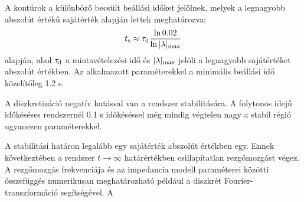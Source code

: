 A kontúrok a különböző becsült beállási időket jelölnek, melyek a legnagyobb abszolút értékű sajátérték 
alapján lettek meghatározva:
\begin{align}
    \begin{split}
        t_{\mathrm{s}} \approx \tau_{\mathrm{d}} \frac{\ln{0.02}}{\ln{|\lambda|_{\mathrm{max}}}}
    \end{split}        
\end{align}
alapján, ahol \(\tau_{\mathrm{d}}\) a mintavételezési idő és \(|\lambda|_{\mathrm{max}}\) jelöli a legnagyobb sajátértéket 
abszolút értékben. Az alkalmazott paraméterekkel a minimális beállási idő közelítőleg 1.2 s. 

A diszkretizáció negatív hatással van a rendszer stabilitására. A folytonos idejű időkéséses rendszernél 0.1 s 
időkéséssel még mindig végtelen nagy a stabil régió ugyanezen paraméterekkel. 

A stabilitási határon legalább egy sajátérték abszolút értékben egy. Ennek következtében a rendszer 
\(t\rightarrow\infty\) határértékben csillapítatlan rezgőmozgást végez. A rezgőmozgás frekvenciája és az 
impedancia modell paraméterei közötti összefüggés numerikusan meghatározható például a diszkrét 
Fourier-transzformáció segítségével. A 